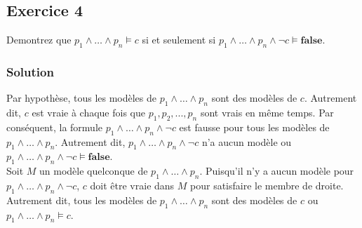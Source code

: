 \subsection*{Exercice 4}
Demontrez que $p_1 \wedge \ldots \wedge p_n \models c$ si et seulement si $p_1 \wedge \ldots \wedge p_n \wedge \neg c \models \textbf{false}$.

    \subsubsection*{Solution}

\noindent \fbox{$\implies$} Par hypothèse, tous les modèles de $p_1 \wedge \ldots \wedge p_n$ sont des modèles de $c$. Autrement dit, $c$ est vraie à chaque fois que  $p_1,p_2,...,p_n$ sont vrais en même temps. Par conséquent, la formule $p_1 \wedge \ldots \wedge p_n \wedge \neg c$ est fausse pour tous les modèles de $p_1 \wedge \ldots \wedge p_n$. Autrement dit, $p_1 \wedge \ldots \wedge p_n \wedge \neg c$ n'a aucun modèle ou $p_1 \wedge \ldots \wedge p_n \wedge \neg c \models \textbf{false}$. \\

\noindent \fbox{$\impliedby$} Soit $M$ un modèle quelconque de  $p_1 \wedge \ldots \wedge p_n$. Puisqu'il n'y a aucun modèle pour  $p_1 \wedge \ldots \wedge p_n \wedge \neg c$, $c$ doit être vraie dans $M$ pour satisfaire le membre de droite. Autrement dit, tous les modèles de $p_1 \wedge \ldots \wedge p_n$ sont des modèles de $c$ ou $p_1 \wedge \ldots \wedge p_n \models c$.